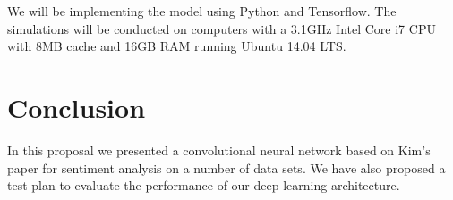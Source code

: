 \documentclass[conference]{IEEEtran}
\begin{document}
      We will be implementing the model using Python and Tensorflow. The simulations will be conducted on
      computers with a 3.1GHz Intel Core i7 CPU with 8MB cache and 16GB RAM running Ubuntu 14.04 LTS.

\section{Conclusion}
In this proposal we presented a convolutional neural network based on Kim's paper for sentiment
analysis on a number of data sets. We have also proposed a test plan to evaluate the performance of our
deep learning architecture.



\end{document}
